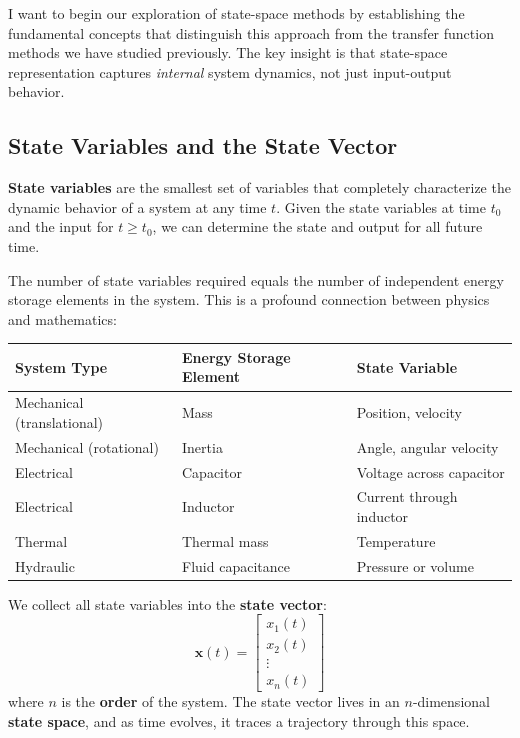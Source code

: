 I want to begin our exploration of state-space methods by establishing the fundamental concepts that distinguish this approach from the transfer function methods we have studied previously. The key insight is that state-space representation captures \textit{internal} system dynamics, not just input-output behavior.

\subsection{State Variables and the State Vector}

\begin{definition}
\textbf{State variables} are the smallest set of variables that completely characterize the dynamic behavior of a system at any time $t$. Given the state variables at time $t_0$ and the input for $t \geq t_0$, we can determine the state and output for all future time.
\end{definition}

The number of state variables required equals the number of independent energy storage elements in the system. This is a profound connection between physics and mathematics:

\begin{center}
\begin{tabular}{lll}
\toprule
\textbf{System Type} & \textbf{Energy Storage Element} & \textbf{State Variable} \\
\midrule
Mechanical (translational) & Mass & Position, velocity \\
Mechanical (rotational) & Inertia & Angle, angular velocity \\
Electrical & Capacitor & Voltage across capacitor \\
Electrical & Inductor & Current through inductor \\
Thermal & Thermal mass & Temperature \\
Hydraulic & Fluid capacitance & Pressure or volume \\
\bottomrule
\end{tabular}
\end{center}

We collect all state variables into the \textbf{state vector}:
\begin{equation}
\mathbf{x}(t) = \begin{bmatrix} x_1(t) \\ x_2(t) \\ \vdots \\ x_n(t) \end{bmatrix}
\end{equation}
where $n$ is the \textbf{order} of the system. The state vector lives in an $n$-dimensional \textbf{state space}, and as time evolves, it traces a trajectory through this space.

